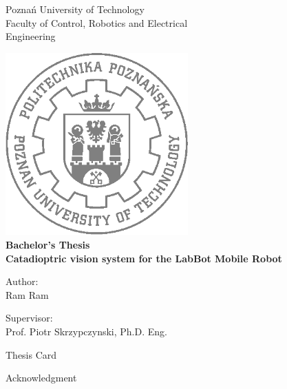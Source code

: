 \documentclass[11pt, a4paper, openany]{book}
\institute{Faculty of Control, Robotics}
\begin{document}
\begin{center}
\thispagestyle{empty}
\LARGE{Poznań University of Technology}\\%
\LARGE{Faculty of Control, Robotics and Electrical }\\%
\LARGE{Engineering} \\%
\vspace{0.3cm}
\begin{center}
\includegraphics[width=7cm]{pplogo.png}\\
\vspace{0.9cm}
\textbf{\Large{Bachelor’s Thesis}}\\
\textbf{\LARGE{Catadioptric vision system for the LabBot Mobile Robot}} \\[4ex]
\medskip\par
\vspace{1.2cm}
\large{Author:}\\
\large{Ram Ram}\\
\vspace{4cm}
\end{center}
\medskip
\large{Supervisor:}\\
\large{Prof. Piotr Skrzypczynski, Ph.D. Eng.}\\
\end{center}
\newpage
Thesis Card
\newpage
\begin{center}
 {\huge Acknowledgment}
\end{center}
\end{document}
